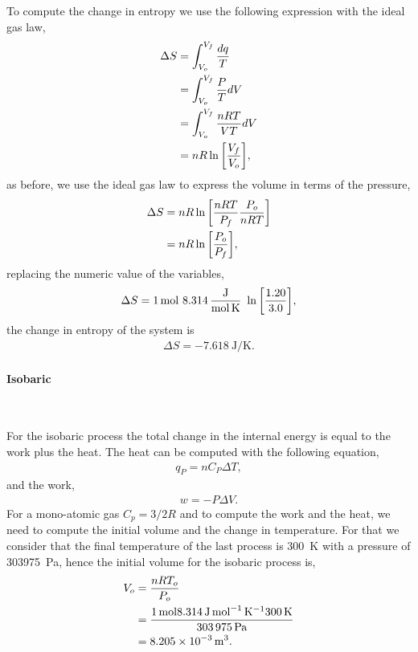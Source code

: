 \documentclass[main.tex]{subfiles}
\begin{document}
To compute the change in entropy we use the following expression with the ideal gas law,
\begin{align*}
    \Delta S &= \int_{V_o}^{V_f}\frac{dq}{T} \\
    &= \int_{V_o}^{V_f}\frac{P}{T}dV \\
    &= \int_{V_o}^{V_f}\frac{nRT}{VT}dV \\
    &= nR\ln\qty[\frac{V_f}{V_o}],
\end{align*}
as before, we use the ideal gas law to express the volume in terms of the pressure,
\begin{align*}
    \Delta S &= nR\ln\qty[\frac{nRT}{P_f}\frac{P_o}{nRT}] \\
    &= nR\ln\qty[\frac{P_o}{P_f}],
\end{align*}
replacing the numeric value of the variables,
\begin{align*}
    \Delta S = \SI{1}{\mol}~\SI[per-mode=fraction]{8.314}{\joule\per\mole\per\kelvin}~\ln\qty[\frac{1.20}{3.0}],
\end{align*}
the change in entropy of the system is
\begin{gather*}
    \boxed{\Delta S = -\SI[per-mode=fraction]{7.618}{\joule\per\kelvin}.}
\end{gather*}


\paragraph{Isobaric}~

For the isobaric process the total change in the internal energy is equal to the work plus the heat.
The heat can be computed with the following equation,
\begin{gather*}
    q_P = nC_P\Delta T,
\end{gather*}
and the work,
\begin{gather*}
    w = -P\Delta V.
\end{gather*}
For a mono-atomic gas $C_p=3/2R$ and to compute the work and the heat, we need to compute the initial volume and the change in temperature.
For that we consider that the final temperature of the last process is \SI{300}{\kelvin} with a pressure of \SI{303975}{\pascal}, hence the initial volume for the isobaric process is,
\begin{align*}
    V_{o} &= \frac{nRT_o}{P_o} \\
    &= \frac{\SI{1}{\mol}\SI{8.314}{\joule\per\mole\per\kelvin}\SI{300}{\kelvin}}{\SI{303975}{\pascal}} \\
    &= \SI{8.205d-3}{\meter\tothe{3}}.
\end{align*}
\end{document}
